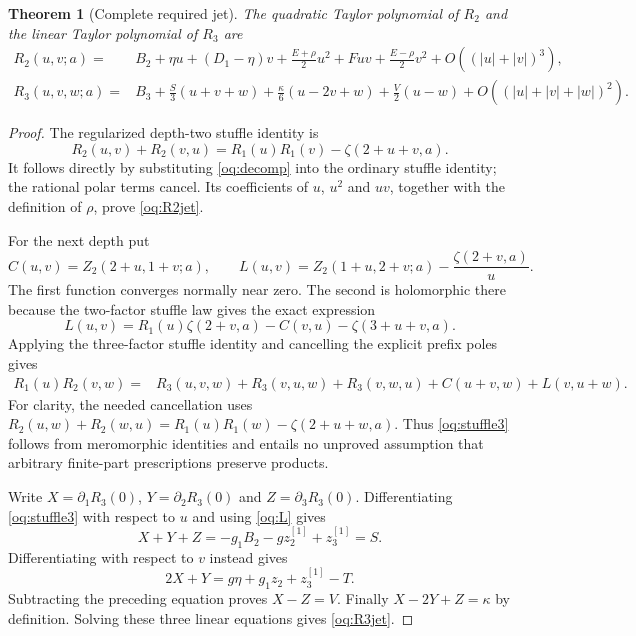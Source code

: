 \documentclass[11pt,a4paper]{article}
\numberwithin{equation}{section}
\newtheorem{theorem}{Theorem}[section]
\theoremstyle{definition}
\theoremstyle{remark}
\begin{document}
\begin{theorem}[Complete required jet]\label{oq:jet}
The quadratic Taylor polynomial of $R_2$ and the linear Taylor polynomial
of $R_3$ are
\begin{align}\label{oq:R2jet}
 R_2(u,v;a)={}&B_2+\eta u+(D_1-\eta)v
 +\frac{E+\rho}{2}u^2+Fuv+\frac{E-\rho}{2}v^2
 +O((|u|+|v|)^3),\\
 R_3(u,v,w;a)={}&B_3+
 \frac S3(u+v+w)+\frac\kappa6(u-2v+w)
 +\frac V2(u-w)+O((|u|+|v|+|w|)^2).
 \label{oq:R3jet}
\end{align}
\end{theorem}
\begin{proof}
The regularized depth-two stuffle identity is
\begin{equation}\label{oq:stuffle2}
 R_2(u,v)+R_2(v,u)=R_1(u)R_1(v)-\zeta(2+u+v,a).
\end{equation}
It follows directly by substituting \eqref{oq:decomp} into the ordinary
stuffle identity; the rational polar terms cancel. Its coefficients of
$u$, $u^2$ and $uv$, together with the definition of $\rho$, prove
\eqref{oq:R2jet}.

For the next depth put
\[
 C(u,v)=Z_2(2+u,1+v;a),\qquad
 L(u,v)=Z_2(1+u,2+v;a)-\frac{\zeta(2+v,a)}u.
\]
The first function converges normally near zero. The second is holomorphic
there because the two-factor stuffle law gives the exact expression
\begin{equation}\label{oq:L}
 L(u,v)=R_1(u)\zeta(2+v,a)-C(v,u)-\zeta(3+u+v,a).
\end{equation}
Applying the three-factor stuffle identity and cancelling the explicit
prefix poles gives
\begin{align}\label{oq:stuffle3}
 R_1(u)R_2(v,w)={}&R_3(u,v,w)+R_3(v,u,w)+R_3(v,w,u)
 +C(u+v,w)+L(v,u+w).
\end{align}
For clarity, the needed cancellation uses
$R_2(u,w)+R_2(w,u)=R_1(u)R_1(w)-\zeta(2+u+w,a)$.
Thus \eqref{oq:stuffle3} follows from meromorphic identities and entails
no unproved assumption that arbitrary finite-part prescriptions preserve
products.

Write $X=\partial_1R_3(0)$, $Y=\partial_2R_3(0)$ and
$Z=\partial_3R_3(0)$. Differentiating \eqref{oq:stuffle3} with respect
to $u$ and using \eqref{oq:L} gives
\[
 X+Y+Z=-g_1B_2-gz_2^{[1]}+z_3^{[1]}=S.
\]
Differentiating with respect to $v$ instead gives
\[
 2X+Y=g\eta+g_1z_2+z_3^{[1]}-T.
\]
Subtracting the preceding equation proves $X-Z=V$.
Finally $X-2Y+Z=\kappa$ by definition. Solving these three linear
equations gives \eqref{oq:R3jet}.
\end{proof}
\end{document}
